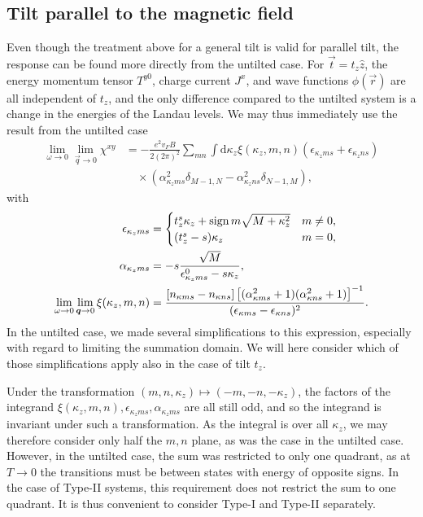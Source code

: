 \subsection{Tilt parallel to the magnetic field}
Even though the treatment above for a general tilt is valid for parallel tilt, the response can be found more directly from the untilted case.
For \( \vec{t} = t_z \hat{z} \), the energy momentum tensor \( T^{y 0} \), charge current \( J^x \), and wave functions \( \phi(\vec{r}) \) are all independent of \( t_z \), and the only difference compared to the untilted system is a change in the energies of the Landau levels.
We may thus immediately use the result from the untilted case
\begin{equation}
  \label{eq:120}
  \begin{split}
  \lim_{\omega \to 0} \lim_{\vec{q} \to 0} \chi^{xy} &=
  - \frac{e^2 v_F B}{2 (2\pi)^2}
  \sum\limits_{mn} \int \mathrm{d} \kappa_z
  \xi(\kappa_z, m, n)
  (\epsilon_{\kappa_z m s} + \epsilon_{\kappa_z n s})\\
  &\quad \times (\alpha_{\kappa_z m s}^2 \delta_{M-1, N} - \alpha_{\kappa_z n s}^2 \delta_{N-1, M}),
  \end{split}
\end{equation}
with
\begin{align}
  \label{eq:121}
  \epsilon_{\kappa_z m s} &=
                          \begin{cases}
                            t_z^s \kappa_z + \operatorname{sign}{m} \sqrt{M + \kappa_z^2} & m \neq 0,\\
                            (t_z^s - s) \kappa_z & m = 0,
                          \end{cases}\\
  \alpha_{\kappa_z m s} &=
                          -s \frac{\sqrt{M}}{\epsilon_{\kappa_z  m s}^0 - s \kappa_z },\\
  \lim_{\omega \to 0} \lim_{\bm{q} \to 0}\xi(\kappa_z, m, n) &= \frac{[n_{\kappa ms} - n_{\kappa ns}]
  \left[ (\alpha_{\kappa ms}^2 + 1) (\alpha_{\kappa ns}^2 + 1) \right]^{-1}
  }{
    (\epsilon _{\kappa m s} - \epsilon _{\kappa n s})^2
  }.
\end{align}
In the untilted case, we made several simplifications to this expression, especially with regard to limiting the summation domain.
We will here consider which of those simplifications apply also in the case of tilt \( t_z \).

Under the transformation \( (m,n,\kappa_z) \mapsto (-m, -n , -\kappa_z) \), the factors of the integrand \( \xi(\kappa_z, m, n), \epsilon_{\kappa_z m s}, \alpha_{\kappa_z m s} \) are all still odd, and so the integrand is invariant under such a transformation.
As the integral is over all \( \kappa_z \), we may therefore consider only half the \( m,n \) plane, as was the case in the untilted case.
However, in the untilted case, the sum was restricted to only one quadrant, as at \( T\to 0 \) the transitions must be between states with energy of opposite signs.
In the case of Type-II systems, this requirement does not restrict the sum to one quadrant.
It is thus convenient to consider Type-I and Type-II separately.

